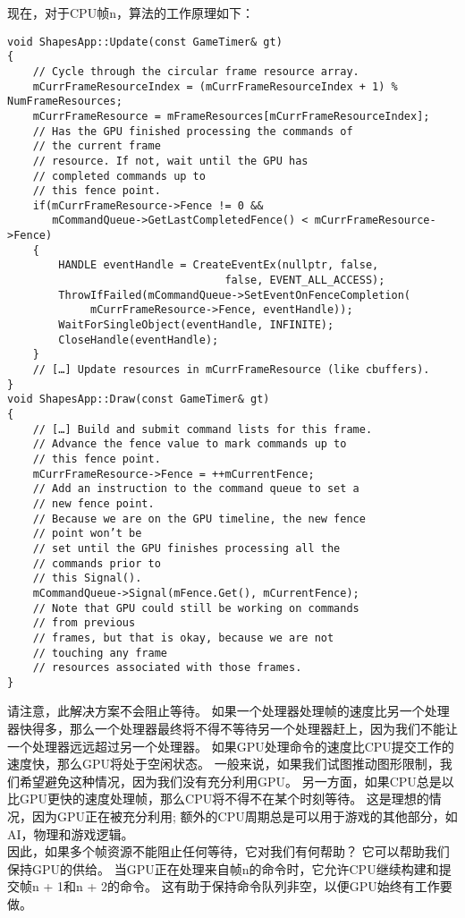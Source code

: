 \begin{flushleft}
现在，对于CPU帧n，算法的工作原理如下：\\
\end{flushleft}
\begin{lstlisting}
void ShapesApp::Update(const GameTimer& gt)
{
    // Cycle through the circular frame resource array.
    mCurrFrameResourceIndex = (mCurrFrameResourceIndex + 1) % NumFrameResources;
    mCurrFrameResource = mFrameResources[mCurrFrameResourceIndex];
    // Has the GPU finished processing the commands of
    // the current frame
    // resource. If not, wait until the GPU has
    // completed commands up to
    // this fence point.
    if(mCurrFrameResource->Fence != 0 &&
       mCommandQueue->GetLastCompletedFence() < mCurrFrameResource->Fence)
    {
        HANDLE eventHandle = CreateEventEx(nullptr, false, 
                                  false, EVENT_ALL_ACCESS);
        ThrowIfFailed(mCommandQueue->SetEventOnFenceCompletion(
             mCurrFrameResource->Fence, eventHandle));
        WaitForSingleObject(eventHandle, INFINITE);
        CloseHandle(eventHandle);
    }
    // […] Update resources in mCurrFrameResource (like cbuffers).
}
void ShapesApp::Draw(const GameTimer& gt)
{
    // […] Build and submit command lists for this frame.
    // Advance the fence value to mark commands up to
    // this fence point.
    mCurrFrameResource->Fence = ++mCurrentFence;
    // Add an instruction to the command queue to set a
    // new fence point.
    // Because we are on the GPU timeline, the new fence
    // point won’t be
    // set until the GPU finishes processing all the
    // commands prior to
    // this Signal().
    mCommandQueue->Signal(mFence.Get(), mCurrentFence);
    // Note that GPU could still be working on commands
    // from previous
    // frames, but that is okay, because we are not
    // touching any frame
    // resources associated with those frames.
}
\end{lstlisting}
\begin{flushleft}
请注意，此解决方案不会阻止等待。 如果一个处理器处理帧的速度比另一个处理器快得多，那么一个处理器最终将不得不等待另一个处理器赶上，因为我们不能让一个处理器远远超过另一个处理器。 如果GPU处理命令的速度比CPU提交工作的速度快，那么GPU将处于空闲状态。 一般来说，如果我们试图推动图形限制，我们希望避免这种情况，因为我们没有充分利用GPU。 另一方面，如果CPU总是以比GPU更快的速度处理帧，那么CPU将不得不在某个时刻等待。 这是理想的情况，因为GPU正在被充分利用; 额外的CPU周期总是可以用于游戏的其他部分，如AI，物理和游戏逻辑。\\
因此，如果多个帧资源不能阻止任何等待，它对我们有何帮助？ 它可以帮助我们保持GPU的供给。 当GPU正在处理来自帧n的命令时，它允许CPU继续构建和提交帧n + 1和n + 2的命令。 这有助于保持命令队列非空，以便GPU始终有工作要做。
\end{flushleft}

